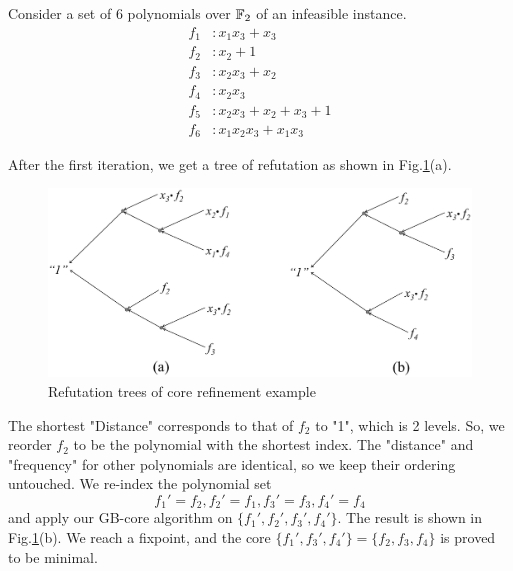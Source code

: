 \begin{example} 
Consider a set of 6 polynomials over ${\mathbb{F}}_2$ of an
infeasible instance.
\begin{align*}
f_1 &: x_1x_3+x_3\\
f_2 &: x_2 + 1\\
f_3 &: x_2x_3+x_2\\
f_4 &: x_2x_3\\
f_5 &: x_2x_3 + x_2 + x_3 + 1\\
f_6 &: x_1x_2x_3 +x_1x_3
\end{align*}

After the first iteration, we get a tree of refutation as shown in Fig.\ref{fig:refine}(a). 
\begin{figure}[hbt]
\centering
\includegraphics[scale=0.25]{SAT2016_xiaojun/core_refine.eps}
\caption{Refutation trees of core refinement example}
\label{fig:refine}
\end{figure}

The shortest "Distance" corresponds to that of $f_2$ to "1", which is
2 levels. So, we reorder $f_2$ to be the polynomial with the shortest
index. The "distance" and "frequency" for other polynomials are
identical, so we keep their ordering untouched. We re-index the
polynomial set 
$$f_1'=f_2, f_2' = f_1, f_3' = f_3, f_4' = f_4$$
and apply our GB-core algorithm on $\{f_1',f_2',f_3',f_4'\}$. The
result is shown in Fig.\ref{fig:refine}(b). We reach a fixpoint, and
the core $\{f_1', f_3', f_4'\} = \{f_2,f_3,f_4\}$ is proved to be
minimal. 
\end{example}
